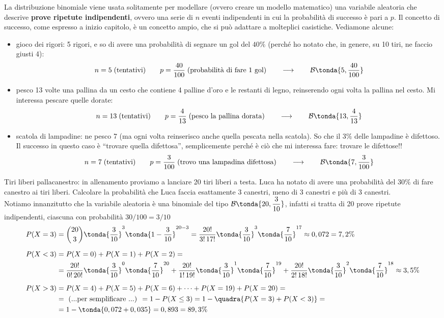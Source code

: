 La distribuzione binomiale viene usata solitamente per modellare (ovvero creare un modello matematico) una variabile aleatoria che descrive \textbf{prove ripetute indipendenti}, ovvero una serie di \(n\) eventi indipendenti in cui la probabilità di successo è pari a \(p\). Il concetto di successo, come espresso a inizio capitolo, è un concetto ampio, che si può adattare a molteplici casistiche. Vediamone alcune:
\begin{itemize}
\item gioco dei rigori: 5 rigori, e so di avere una probabilità di segnare un gol del \(40\%\) (perché ho notato che, in genere, su 10 tiri, ne faccio giusti 4):
\[n = 5\; \text{(tentativi)} \qquad p = \dfrac{40}{100} \;\text{(probabilità di fare 1 gol)} \qquad \longrightarrow \qquad \mathcal{B}\tonda{5, \dfrac{40}{100}}\]
\item pesco 13 volte una pallina da un cesto che contiene 4 palline d'oro e le restanti di legno, reinserendo ogni volta la pallina nel cesto. Mi interessa pescare quelle dorate:
\[n = 13\; \text{(tentativi)} \qquad p = \dfrac{4}{13} \;\text{(pesco la pallina dorata)} \qquad \longrightarrow \qquad \mathcal{B}\tonda{13, \dfrac{4}{13}}\]
\item scatola di lampadine: ne pesco 7 (ma ogni volta reinserisco anche quella pescata nella scatola). So che il \(3\%\) delle lampadine è difettoso. Il successo in questo caso è ``trovare quella difettosa'', semplicemente perché è ciò che mi interessa fare: trovare le difettose!!
\[n = 7\; \text{(tentativi)} \qquad p = \dfrac{3}{100} \;\text{(trovo una lampadina difettosa)} \qquad \longrightarrow \qquad \mathcal{B}\tonda{7, \dfrac{3}{100}}\]
\end{itemize}
\begin{esempio} Tiri liberi pallacanestro: in allenamento proviamo a lanciare 20 tiri liberi a testa. Luca ha notato di avere una probabilità del \(30\%\) di fare canestro ai tiri liberi. Calcolare la probabilità che Luca faccia esattamente 3 canestri, meno di 3 canestri e più di 3 canestri.\\[5pt]
Notiamo innanzitutto che la variabile aleatoria è una binomiale del tipo \(\mathcal{B}\tonda{20,\dfrac{3}{10}}\), infatti si tratta di 20 prove ripetute indipendenti, ciascuna con probabilità \(30/100 = 3/10\) 
\[\begin{split} P(X = 3) &= \binom{20}{3} \tonda{\dfrac{3}{10}}^3 \tonda{1-\dfrac{3}{10}}^{20-3} = \dfrac{20!}{3!\,17!} \tonda{\dfrac{3}{10}}^3 \tonda{\dfrac{7}{10}}^{17} \approx 0,072 = 7,2\% \\[6pt]
P(X<3) &= P(X=0)+P(X=1)+P(X=2)=\\
&= \dfrac{20!}{0!\,20!} \tonda{\dfrac{3}{10}}^0 \tonda{\dfrac{7}{10}}^{20}+\dfrac{20!}{1!\,19!} \tonda{\dfrac{3}{10}}^1 \tonda{\dfrac{7}{10}}^{19}+\dfrac{20!}{2!\,18!} \tonda{\dfrac{3}{10}}^2 \tonda{\dfrac{7}{10}}^{18} \approx 3,5 \%  \\[6pt]
P(X>3) &=  P(X=4)+P(X=5)+P(X=6)+\dots+P(X=19)+P(X=20)=\\
&= \text{ (...per semplificare ...) } = 1-P(X\leq3) = 1-\quadra{P(X=3)+P(X<3)} = \\
&= 1-\tonda{0,072+0,035} =0,893 =89,3 \% \end{split}\]
\end{esempio}

